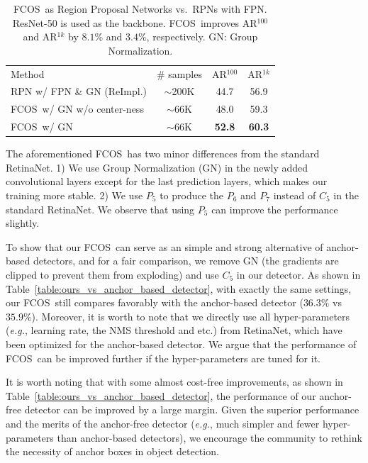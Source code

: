 \documentclass[10pt,twocolumn,letterpaper]{article}
\newcommand{\1}{{\mathbbm{1}}}           %
\def\Ours{{FCNDet}\xspace}
\def\Ours{{FCOS}\xspace}
\def\eg{{\it e.g.}\xspace}
\begin{document}
\begin{table}[!htp]
%
\centering 
\small
\begin{tabular}{  l |c|c|c }
Method & \# samples & AR$^{100}$ & AR$^{1k}$ \\
\Xhline{2\arrayrulewidth}
%
%
RPN w/ FPN \& GN (ReImpl.) & $\sim$200K & 44.7 & 56.9 \\
\Ours\ w/ GN w/o center-ness & $\sim$66K & 48.0 & 59.3 \\
\Ours\ w/ GN & $\sim$66K & \textbf{52.8} & \textbf{60.3} \\
\end{tabular}
%
%
\caption{\Ours\ as Region Proposal Networks vs.\ 
RPNs with FPN. ResNet-50 is used as the backbone. \Ours\ improves AR$^{100}$ and AR$^{1k}$ by $8.1\%$ and $3.4\%$, respectively. GN: Group Normalization.}
\label{table:rpn_fpn}
\vspace{-0.7cm}
\end{table}

The aforementioned \Ours\ has two minor differences from the standard RetinaNet. 1) We use Group Normalization (GN) \cite{wu2018group} in the newly added convolutional layers except for the last prediction layers, which makes our training more stable. 2) We use $P_5$ to produce the $P_6$ and $P_7$ instead of $C_5$ in the standard RetinaNet. We observe that using $P_5$ can improve the performance slightly.

To show that our \Ours\ can serve as an simple and strong alternative of anchor-based detectors, and for a fair comparison, 
we remove GN (the gradients are clipped to prevent them from exploding) and use $C_5$ in our detector. As shown in Table~\ref{table:ours_vs_anchor_based_detector}, with exactly the same settings, our \Ours\ still compares favorably with the anchor-based detector ($36.3\%$ vs $35.9\%$). Moreover, it is worth to note that we directly use all hyper-parameters (\eg, learning rate, the NMS threshold and etc.) from RetinaNet, which have been optimized for the anchor-based detector. We argue that the performance of \Ours\ can be improved further if the hyper-parameters are tuned for it.

It is worth noting that with some almost cost-free improvements, as shown in Table~\ref{table:ours_vs_anchor_based_detector}, the performance of our anchor-free detector can be improved by a large margin. Given the superior performance and the merits of the anchor-free detector (\eg, much simpler and fewer hyper-parameters than anchor-based detectors), we encourage the community to rethink the necessity of anchor boxes in object detection.
%
\end{document}
